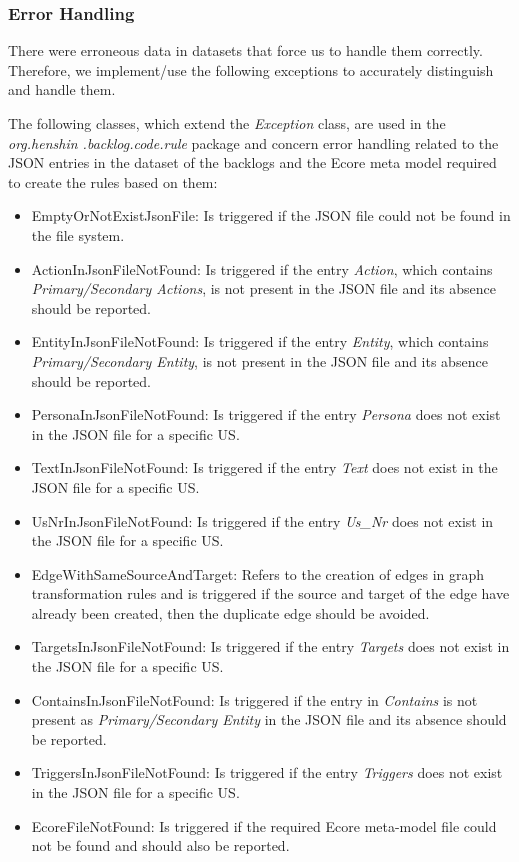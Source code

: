 \subsubsection*{Error Handling}
There were erroneous data in datasets that force us to handle them correctly. Therefore, we implement/use the following exceptions to accurately distinguish and handle them.

The following classes, which extend the \textit{Exception} class, are used in the \textit{org.henshin .backlog.code.rule} package and concern error handling related to the JSON entries in the dataset of the backlogs and the Ecore meta model required to create the rules based on them:
\begin{itemize}
	\item EmptyOrNotExistJsonFile: Is triggered if the JSON file could not be found in the file system.
	
	\item ActionInJsonFileNotFound: Is triggered if the entry \textit{Action}, which contains \textit{Primary/Secondary Actions}, is not present in the JSON file and its absence should be reported.
	
	\item EntityInJsonFileNotFound: Is triggered if the entry \textit{Entity}, which contains \textit{Primary/Secondary Entity}, is not present in the JSON file and its absence should be reported.
	
	\item PersonaInJsonFileNotFound: Is triggered if the entry \textit{Persona} does not exist in the JSON file for a specific US.
	
	\item TextInJsonFileNotFound: Is triggered if the entry \textit{Text} does not exist in the JSON file for a specific US. 
	
	\item UsNrInJsonFileNotFound: Is triggered if the entry \textit{Us\_Nr} does not exist in the JSON file for a specific US.

	\item EdgeWithSameSourceAndTarget: Refers to the creation of edges in graph transformation rules and is triggered if the source and target of the edge have already been created, then the duplicate edge should be avoided.
		
	\item TargetsInJsonFileNotFound: Is triggered if the entry \textit{Targets} does not exist in the JSON file for a specific US.
	
	\item ContainsInJsonFileNotFound: Is triggered if the entry in \textit{Contains} is not present as \textit{Primary/Secondary Entity} in the JSON file and its absence should be reported.
	
	\item TriggersInJsonFileNotFound: Is triggered if the entry \textit{Triggers} does not exist in the JSON file for a specific US. 
	
	\item EcoreFileNotFound: Is triggered if the required Ecore meta-model file could not be found and should also be reported.
\end{itemize}
